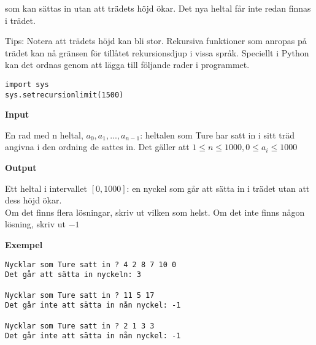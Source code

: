 \documentclass[a4paper,12pt]{article}
\begin{document}
som kan sättas in utan att trädets höjd ökar. Det nya heltal får inte redan finnas i trädet.

Tips: Notera att trädets höjd kan bli stor. Rekursiva funktioner som anropas på trädet kan nå gränsen för tillåtet rekursionsdjup i vissa språk. Speciellt i Python kan det ordnas genom att lägga till följande rader i programmet.

\begin{lstlisting}
import sys
sys.setrecursionlimit(1500)
\end{lstlisting}


\textbf{Input}

En rad med n heltal, $a_0, a_1, ..., a_{n−1}$: heltalen som Ture har satt in i sitt träd angivna i den ordning de sattes in. Det gäller att $1{\le}n\le1000,0{\le}a_i\le1000$

\textbf{Output}

Ett heltal i intervallet $[0,1000]$: en nyckel som går att sätta in i trädet utan att dess höjd ökar. \\
Om det finns flera lösningar, skriv ut vilken som helst. Om det inte finns någon lösning, skriv ut $-1$

\textbf{Exempel}

\begin{lstlisting}
Nycklar som Ture satt in ? 4 2 8 7 10 0
Det går att sätta in nyckeln: 3

Nycklar som Ture satt in ? 11 5 17
Det går inte att sätta in nån nyckel: -1

Nycklar som Ture satt in ? 2 1 3 3
Det går inte att sätta in nån nyckel: -1
\end{lstlisting}
\end{document}
